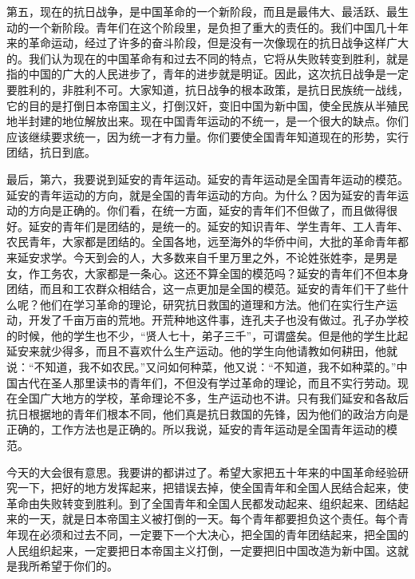 第五，现在的抗日战争，是中国革命的一个新阶段，而且是最伟大、最活跃、最生动的一个新阶段。青年们在这个阶段里，是负担了重大的责任的。我们中国几十年来的革命运动，经过了许多的奋斗阶段，但是没有一次像现在的抗日战争这样广大的。我们认为现在的中国革命有和过去不同的特点，它将从失败转变到胜利，就是指的中国的广大的人民进步了，青年的进步就是明证。因此，这次抗日战争是一定要胜利的，非胜利不可。大家知道，抗日战争的根本政策，是抗日民族统一战线，它的目的是打倒日本帝国主义，打倒汉奸，变旧中国为新中国，使全民族从半殖民地半封建的地位解放出来。现在中国青年运动的不统一，是一个很大的缺点。你们应该继续要求统一，因为统一才有力量。你们要使全国青年知道现在的形势，实行团结，抗日到底。

最后，第六，我要说到延安的青年运动。延安的青年运动是全国青年运动的模范。延安的青年运动的方向，就是全国的青年运动的方向。为什么？因为延安的青年运动的方向是正确的。你们看，在统一方面，延安的青年们不但做了，而且做得很好。延安的青年们是团结的，是统一的。延安的知识青年、学生青年、工人青年、农民青年，大家都是团结的。全国各地，远至海外的华侨中间，大批的革命青年都来延安求学。今天到会的人，大多数来自千里万里之外，不论姓张姓李，是男是女，作工务农，大家都是一条心。这还不算全国的模范吗？延安的青年们不但本身团结，而且和工农群众相结合，这一点更加是全国的模范。延安的青年们干了些什么呢？他们在学习革命的理论，研究抗日救国的道理和方法。他们在实行生产运动，开发了千亩万亩的荒地。开荒种地这件事，连孔夫子也没有做过。孔子办学校的时候，他的学生也不少，“贤人七十，弟子三千”，可谓盛矣。但是他的学生比起延安来就少得多，而且不喜欢什么生产运动。他的学生向他请教如何耕田，他就说：“不知道，我不如农民。”又问如何种菜，他又说：“不知道，我不如种菜的。”中国古代在圣人那里读书的青年们，不但没有学过革命的理论，而且不实行劳动。现在全国广大地方的学校，革命理论不多，生产运动也不讲。只有我们延安和各敌后抗日根据地的青年们根本不同，他们真是抗日救国的先锋，因为他们的政治方向是正确的，工作方法也是正确的。所以我说，延安的青年运动是全国青年运动的模范。

今天的大会很有意思。我要讲的都讲过了。希望大家把五十年来的中国革命经验研究一下，把好的地方发挥起来，把错误去掉，使全国青年和全国人民结合起来，使革命由失败转变到胜利。到了全国青年和全国人民都发动起来、组织起来、团结起来的一天，就是日本帝国主义被打倒的一天。每个青年都要担负这个责任。每个青年现在必须和过去不同，一定要下一个大决心，把全国的青年团结起来，把全国的人民组织起来，一定要把日本帝国主义打倒，一定要把旧中国改造为新中国。这就是我所希望于你们的。


